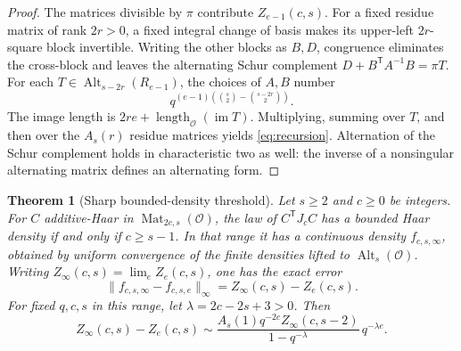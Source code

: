\documentclass[11pt]{article}
\newtheorem{theorem}{Theorem}[section]
\theoremstyle{remark}
\newcommand{\OO}{\mathcal O}
\newcommand{\Mat}{\operatorname{Mat}}
\newcommand{\Alt}{\operatorname{Alt}}
\newcommand{\im}{\operatorname{im}}
\newcommand{\length}{\operatorname{length}}
\newcommand{\trans}{\mathsf T}
\begin{document}
\begin{proof}
The matrices divisible by \(\pi\) contribute \(Z_{e-1}(c,s)\).
For a fixed residue matrix of rank \(2r>0\), a fixed integral
change of basis makes its upper-left \(2r\)-square block invertible.
Writing the other blocks as \(B,D\), congruence eliminates the cross-block
and leaves the alternating Schur complement
\(D+B^\trans A^{-1}B=\pi T\).
For each \(T\in\Alt_{s-2r}(R_{e-1})\), the choices of \(A,B\)
number
\[
 q^{(e-1)(\binom{s}{2}-\binom{s-2r}{2})}.
\]
The image length is \(2re+\length_\OO(\im T)\).
Multiplying, summing over \(T\), and then over the \(A_s(r)\) residue
matrices yields \eqref{eq:recursion}.
Alternation of the Schur complement holds in characteristic two as well:
the inverse of a nonsingular alternating matrix defines an alternating
form.
\end{proof}

\begin{theorem}[Sharp bounded-density threshold]\label{thm:regularity}
Let \(s\ge2\) and \(c\ge0\) be integers.
For \(C\) additive-Haar in \(\Mat_{2c,s}(\OO)\), the law of
\(C^\trans J_cC\) has a bounded Haar density if and only if \(c\ge s-1\).
In that range it has a continuous density \(f_{c,s,\infty}\), obtained
by uniform convergence of the finite densities lifted to \(\Alt_s(\OO)\).
Writing \(Z_\infty(c,s)=\lim_eZ_e(c,s)\), one has the exact error
\[
 \|f_{c,s,\infty}-f_{c,s,e}\|_\infty
       =Z_\infty(c,s)-Z_e(c,s).
 \tag{5.4}\label{eq:uniformerror}
\]
For fixed \(q,c,s\) in this range, let \(\lambda=2c-2s+3>0\).
Then
\[
 Z_\infty(c,s)-Z_e(c,s)
 \sim
 \frac{A_s(1)q^{-2c}Z_\infty(c,s-2)}
      {1-q^{-\lambda}}\,q^{-\lambda e}.
 \tag{5.5}\label{eq:sharpdecay}
\]
\end{theorem}
\end{document}
